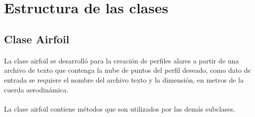 \documentclass[letterpaper, openright, 12pt]{book}
\begin{document}
    \section{Estructura de las clases}
    \subsection{Clase Airfoil}
    \paragraph*{}
    La clase airfoil se desarrolló para la creación de perfiles alares a partir
    de una archivo de texto que contenga la nube de puntos del perfil deseado,
    como dato de entrada se requiere el nombre del archivo texto y la
    dimensión, en metros de la cuerda aerodinámica.

    \paragraph*{}
    La clase airfoil contiene métodos que son utilizados por las demás
    subclases.
\end{document}
